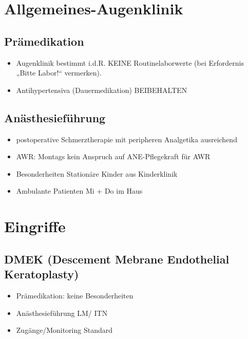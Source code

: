 \documentclass[
]{book}
\providecommand{\tightlist}{%
  \setlength{\itemsep}{0pt}\setlength{\parskip}{0pt}}
\begin{document}
\hypertarget{allgemeines-augenklinik}{%
\section{Allgemeines-Augenklinik}\label{allgemeines-augenklinik}}

\hypertarget{pruxe4medikation}{%
\subsection{Prämedikation}\label{pruxe4medikation}}

\begin{itemize}
\tightlist
\item
  Augenklinik bestimmt i.d.R. KEINE Routinelaborwerte (bei Erfordernis „Bitte Labor!{}`` vermerken).
\item
  Antihypertensiva (Dauermedikation) BEIBEHALTEN
\end{itemize}

\hypertarget{anuxe4sthesiefuxfchrung}{%
\subsection{Anästhesieführung}\label{anuxe4sthesiefuxfchrung}}

\begin{itemize}
\tightlist
\item
  postoperative Schmerztherapie mit peripheren Analgetika ausreichend
\item
  AWR: Montags kein Anspruch auf ANE-Pflegekraft für AWR
\item
  Besonderheiten Stationäre Kinder aus Kinderklinik
\item
  Ambulante Patienten Mi + Do im Haus
\end{itemize}

\hypertarget{eingriffe}{%
\section{Eingriffe}\label{eingriffe}}

\hypertarget{dmek-descement-mebrane-endothelial-keratoplasty}{%
\subsection{DMEK (Descement Mebrane Endothelial Keratoplasty)}\label{dmek-descement-mebrane-endothelial-keratoplasty}}

\begin{itemize}
\tightlist
\item
  Prämedikation: keine Besonderheiten
\item
  Anästhesieführung LM/ ITN
\item
  Zugänge/Monitoring Standard
\end{itemize}
\end{document}
